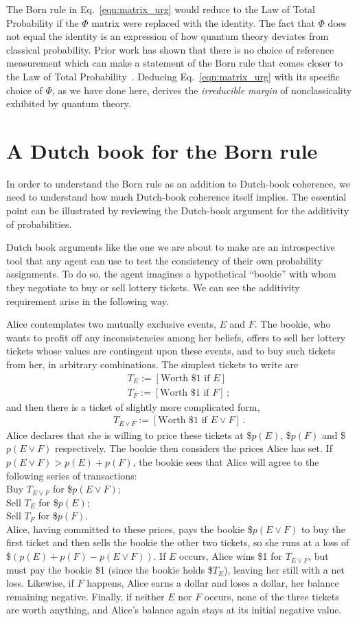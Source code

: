 \documentclass[%
 reprint,superscriptaddress,
 amsmath,amssymb,
 aps,twocolumn,pra
]{revtex4-1}
\newcommand{\eqn}[1]{\begin{eqnarray} #1 \end{eqnarray}}
\newcommand{\tit}[1]{\textit{#1}}
\newcommand{\trm}[1]{\textrm{#1}}
\begin{document}
The Born rule in Eq.\ \eqref{eqn:matrix_urg} would reduce to the Law of Total Probability if the $\Phi$ matrix were replaced with the identity. The fact that $\Phi$ does not equal the identity is an expression of how quantum theory deviates from classical probability. Prior work has shown that there is no choice of reference measurement which can make a statement of the Born rule that comes closer to the Law of Total Probability~\cite{DeBrota20b}. Deducing Eq.\ \eqref{eqn:matrix_urg} with its specific choice of $\Phi$, as we have done here, derives the \tit{irreducible margin} of nonclassicality exhibited by quantum theory.

\section{A Dutch book for the Born rule \label{sec:dutch}}

In order to understand the Born rule as an addition to Dutch-book coherence, we need to understand how much Dutch-book coherence itself implies. The essential point can be illustrated by reviewing the Dutch-book argument for the additivity of probabilities.

Dutch book arguments like the one we are about to make are an introspective tool that any agent can use to test the consistency of their own probability assignments. To do so, the agent imagines a hypothetical ``bookie'' with whom they negotiate to buy or sell lottery tickets. We can see the additivity requirement arise in the following way.

Alice contemplates two mutually exclusive events, $E$ and $F$. The bookie, who wants to profit off any inconsistencies among her beliefs, offers to sell her lottery tickets whose values are contingent upon these events, and to buy such tickets from her, in arbitrary combinations. The simplest tickets to write are
\eqn{
  T_E := [ \trm{Worth \$1 if $E$} ] \, \nonumber \\
  T_F := [ \trm{Worth \$1 if $F$} ] \, ;
}
and then there is a ticket of slightly more complicated form,
\eqn{
  T_{E \lor F} := [ \trm{Worth \$1 if $E \lor F$} ] \, .
}
Alice declares that she is willing to price these tickets at \$$p(E)$, \$$p(F)$ and \$$p(E \lor F)$ respectively. The bookie then considers the prices Alice has set. If $p(E \lor F) > p(E) + p(F)$, the bookie sees that Alice will agree to the following series of transactions:\\
Buy $T_{E \lor F}$ for \$$p(E \lor F)$;\\
Sell $T_E$ for \$$p(E)$;\\
Sell $T_F$ for \$$p(F)$.\\
Alice, having committed to these prices, pays the bookie \$$p(E \lor F)$ to buy the first ticket and then sells the bookie the other two tickets, so she runs at a loss of \$$(p(E) + p(F) - p(E \lor F))$. If $E$ occurs, Alice wins \$1 for $T_{E \lor F}$, but must pay the bookie \$1 (since the bookie holds \$$T_E$), leaving her still with a net loss. Likewise, if $F$ happens, Alice earns a dollar and loses a dollar, her balance remaining negative. Finally, if neither $E$ nor $F$ occurs, none of the three tickets are worth anything, and Alice's balance again stays at its initial negative value.
\end{document}
